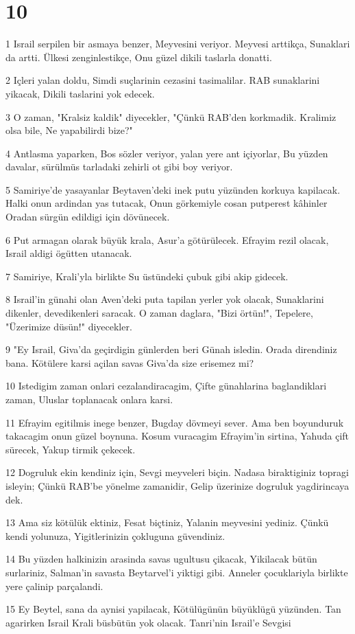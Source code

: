 \chapter{10}

\par 1 Israil serpilen bir asmaya benzer, Meyvesini veriyor. Meyvesi arttikça, Sunaklari da artti. Ülkesi zenginlestikçe, Onu güzel dikili taslarla donatti.
\par 2 Içleri yalan doldu, Simdi suçlarinin cezasini tasimalilar. RAB sunaklarini yikacak, Dikili taslarini yok edecek.
\par 3 O zaman, "Kralsiz kaldik" diyecekler, "Çünkü RAB'den korkmadik. Kralimiz olsa bile, Ne yapabilirdi bize?"
\par 4 Antlasma yaparken, Bos sözler veriyor, yalan yere ant içiyorlar, Bu yüzden davalar, sürülmüs tarladaki zehirli ot gibi boy veriyor.
\par 5 Samiriye'de yasayanlar Beytaven'deki inek putu yüzünden korkuya kapilacak. Halki onun ardindan yas tutacak, Onun görkemiyle cosan putperest kâhinler Oradan sürgün edildigi için dövünecek.
\par 6 Put armagan olarak büyük krala, Asur'a götürülecek. Efrayim rezil olacak, Israil aldigi ögütten utanacak.
\par 7 Samiriye, Krali'yla birlikte Su üstündeki çubuk gibi akip gidecek.
\par 8 Israil'in günahi olan Aven'deki puta tapilan yerler yok olacak, Sunaklarini dikenler, devedikenleri saracak. O zaman daglara, "Bizi örtün!", Tepelere, "Üzerimize düsün!" diyecekler.
\par 9 "Ey Israil, Giva'da geçirdigin günlerden beri Günah isledin. Orada direndiniz bana. Kötülere karsi açilan savas Giva'da size erisemez mi?
\par 10 Istedigim zaman onlari cezalandiracagim, Çifte günahlarina baglandiklari zaman, Uluslar toplanacak onlara karsi.
\par 11 Efrayim egitilmis inege benzer, Bugday dövmeyi sever. Ama ben boyunduruk takacagim onun güzel boynuna. Kosum vuracagim Efrayim'in sirtina, Yahuda çift sürecek, Yakup tirmik çekecek.
\par 12 Dogruluk ekin kendiniz için, Sevgi meyveleri biçin. Nadasa biraktiginiz topragi isleyin; Çünkü RAB'be yönelme zamanidir, Gelip üzerinize dogruluk yagdirincaya dek.
\par 13 Ama siz kötülük ektiniz, Fesat biçtiniz, Yalanin meyvesini yediniz. Çünkü kendi yolunuza, Yigitlerinizin çokluguna güvendiniz.
\par 14 Bu yüzden halkinizin arasinda savas ugultusu çikacak, Yikilacak bütün surlariniz, Salman'in savasta Beytarvel'i yiktigi gibi. Anneler çocuklariyla birlikte yere çalinip parçalandi.
\par 15 Ey Beytel, sana da aynisi yapilacak, Kötülügünün büyüklügü yüzünden. Tan agarirken Israil Krali büsbütün yok olacak. Tanri'nin Israil'e Sevgisi

